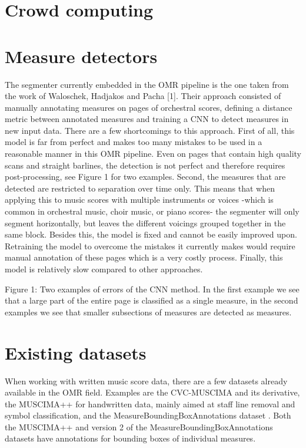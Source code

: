 \section{Crowd computing}\label{sec:related-work-crowd-computing}

\section{Measure detectors}
The segmenter currently embedded in the OMR pipeline is the one taken from the work of Waloschek, Hadjakos and Pacha [1]. Their approach consisted of manually annotating measures on pages of orchestral scores, defining a distance metric between annotated measures and training a CNN to detect measures in new input data. There are a few shortcomings to this approach. First of all, this model is far from perfect and makes too many mistakes to be used in a reasonable manner in this OMR pipeline. Even on pages that contain high quality scans and straight barlines, the detection is not perfect and therefore requires post-processing, see Figure 1 for two examples. Second, the measures that are detected are restricted to separation over time only. This means that when applying this to music scores with multiple instruments or voices -which is common in orchestral music, choir music, or piano scores- the segmenter will only segment horizontally, but leaves the different voicings grouped together in the same block. Besides this, the model is fixed and cannot be easily improved upon. Retraining the model to overcome the mistakes it currently makes would require manual annotation of these pages which is a very costly process. Finally, this model is relatively slow compared to other approaches. 

Figure 1: Two examples of errors of the CNN method. In the first example we see that a large part of the entire page is classified as a single measure, in the second examples we see that smaller subsections of measures are detected as measures.

\section{Existing datasets}\label{sec:related-work-existing-datasets}
When working with written music score data, there are a few datasets already available in the OMR field. Examples are the CVC-MUSCIMA \citep{Fornes2012} and its derivative, the MUSCIMA++ \citep{Hajic2017} for handwritten data, mainly aimed at staff line removal and symbol classification, and the MeasureBoundingBoxAnnotations dataset \citep{Zalkow2019}. Both the MUSCIMA++ and version 2 of the MeasureBoundingBoxAnnotations datasets have annotations for bounding boxes of individual measures.


